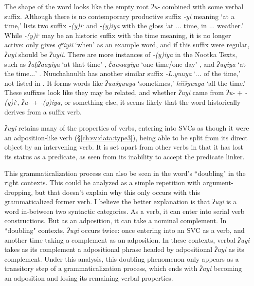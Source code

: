 The shape of the word looks like the empty root \textit{ʔu-} combined with some verbal suffix. Although there is no contemporary productive suffix \textit{-yi} meaning `at a time,' \cite[320]{sapir1939} lists two suffix \textit{-(y)iˑ} and \textit{-(y)iya} with the gloss `at $\ldots$ time, in $\ldots$ weather.' While \textit{-(y)iˑ} may be an historic suffix with the time meaning, it is no longer active: \cite[346]{stonham2005} only gives \textit{qʷiyii} `when' as an example word, and if this suffix were regular, \textit{ʔuyi} should be \textit{ʔuyii}. There are more instances of \textit{-(y)iya} in the Nootka Texts, such as \textit{ʔaḥʔaayiya} `at that time' \citep[16]{sapir1939}, \textit{c̓awaayiya} `one time/one day' \citep[19]{sapir1939}, and \textit{ʔuyiya} `at the time$\ldots$' \citep[112]{sapir1939}. Nuuchahnulth has another similar suffix \textit{-L.yuuya} `$\ldots$ of the time,' not listed in \cite{sapir1939}. It forms words like \textit{ʔuušyuuya} `sometimes,' \textit{hiišyuuya} `all the time.' These suffixes look like they may be related, and whether \textit{ʔuyi} came from \textit{ʔu-} + \textit{-(y)iˑ}, \textit{ʔu-} + \textit{-(y)iya}, or something else, it seems likely that the word historically derives from a suffix verb.

\textit{ʔuyi} retains many of the properties of verbs, entering into SVCs as though it were an adposition-like verb (\S\ref{ch:sv:data:type3}), being able to be split from its direct object by an intervening verb. It is set apart from other verbs in that it has lost its status as a predicate, as seen from its inability to accept the predicate linker.

This grammaticalization process can also be seen in the word's ``doubling" in the right contexts. This could be analyzed as a simple repetition with argument-dropping, but that doesn't explain why this only occurs with this grammaticalized former verb. I believe the better explanation is that \textit{ʔuyi} is a word in-between two syntactic categories. As a verb, it can enter into serial verb constructions. But as an adposition, it can take a nominal complement. In ``doubling" contexts, \textit{ʔuyi} occurs twice: once entering into an SVC as a verb, and another time taking a complement as an adposition. In these contexts, verbal \textit{ʔuyi} takes as its complement a adpositional phrase headed by adpositional \textit{ʔuyi} as its complement. Under this analysis, this doubling phenomenon only appears as a transitory step of a grammaticalization process, which ends with \textit{ʔuyi} becoming an adposition and losing its remaining verbal properties.

